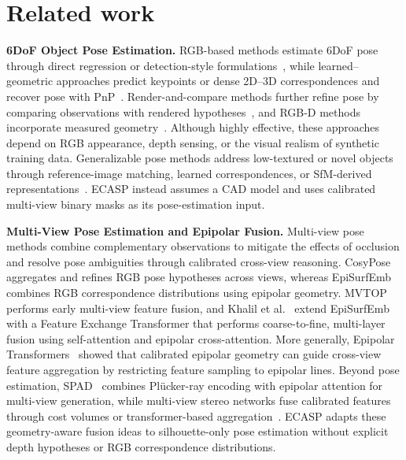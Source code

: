 \chapter{Related work}
\label{sec:relatedwork}

\textbf{6DoF Object Pose Estimation.}
RGB-based methods estimate 6DoF pose through direct regression or detection-style formulations~\cite{xiang2018posecnn,kehl2017ssd6d}, while learned--geometric approaches predict keypoints or dense 2D--3D correspondences and recover pose with PnP~\cite{peng2019pvnet,hodan2020epos,su2022zebrapose,haugaard2022surfemb,di2021sopose,wang2021gdrnet}.
Render-and-compare methods further refine pose by comparing observations with rendered hypotheses~\cite{li2018deepim,labbe2022megapose,wen2024foundationpose}, and RGB-D methods incorporate measured geometry~\cite{wang2019densefusion,he2021ffb6d,he2020pvn3d}.
Although highly effective, these approaches depend on RGB appearance, depth sensing, or the visual realism of synthetic training data.
Generalizable pose methods address low-textured or novel objects through reference-image matching, learned correspondences, or SfM-derived representations~\cite{liu2022gen6d,lin2024sam6d,nguyen2024gigapose,sun2022onepose,he2022oneposeplusplus}.
ECASP instead assumes a CAD model and uses calibrated multi-view binary masks as its pose-estimation input.

\noindent\textbf{Multi-View Pose Estimation and Epipolar Fusion.}
Multi-view pose methods combine complementary observations to mitigate the effects of occlusion and resolve pose ambiguities through calibrated cross-view reasoning.
CosyPose~\cite{labbe2020cosypose} aggregates and refines RGB pose hypotheses across views, whereas EpiSurfEmb~\cite{haugaard2023episurfemb} combines RGB correspondence distributions using epipolar geometry.
MVTOP~\cite{ranftl2026mvtop} performs early multi-view feature fusion, and Khalil et al.~\cite{khalil2025featureexchange} extend EpiSurfEmb with a Feature Exchange Transformer that performs coarse-to-fine, multi-layer fusion using self-attention and epipolar cross-attention.
More generally, Epipolar Transformers~\cite{he2020epipolar} showed that calibrated epipolar geometry can guide cross-view feature aggregation by restricting feature sampling to epipolar lines.
Beyond pose estimation, SPAD~\cite{kant2024spad} combines Pl\"ucker-ray encoding with epipolar attention for multi-view generation, while multi-view stereo networks fuse calibrated features through cost volumes or transformer-based aggregation~\cite{yao2018mvsnet,ding2022transmvsnet,liao2022wtmvsnet}.
ECASP adapts these geometry-aware fusion ideas to silhouette-only pose estimation without explicit depth hypotheses or RGB correspondence distributions.

